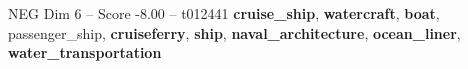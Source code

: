 \begin{textsample}{NEG Dim 6 – Score -8.00 – t012441}  \label{ex:f6_neg_029}
\textbf{cruise\_ship}, \textbf{watercraft}, \textbf{boat}, passenger\_ship, \textbf{cruiseferry}, \textbf{ship}, \textbf{naval\_architecture}, \textbf{ocean\_liner}, \textbf{water\_transportation}

\end{textsample}
